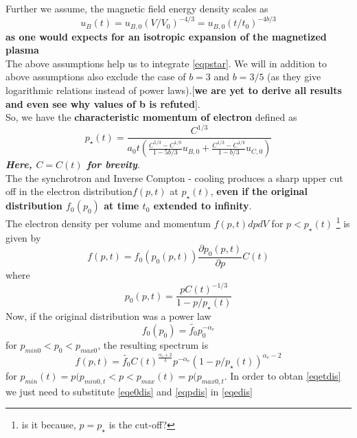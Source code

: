 \documentclass[12pt]{report}
\newcommand{\tbf}[1]{\textbf{#1}}
\newcommand{\tit}[1]{\textit{#1}}
\newcommand{\fn}[1]{\footnote{#1}}
\newcommand{\pe}[2]{\frac{\partial{#1}}{\partial{#2}}}
\newcommand{\cc}[1]{\left({#1}\right)}
\begin{document}
Further we assume, the magnetic field energy density scales as
\begin{equation}
u_B(t)=u_{B,0}(V/V_0)^{-4/3}=u_{B,0}(t/t_0)^{-4b/3}
\end{equation}
\tbf{as one would expects for an isotropic expansion of the magnetized plasma}\\


The above assumptions help us to integrate \eqref{eqpstar}. We will in addition to above assumptions also exclude the case of $b=3$ and $b=3/5$ (as they give logarithmic relations instead of power laws).[\tbf{we are yet to derive all results and even see why values of b is refuted}].\\

So, we have the \tbf{characteristic momentum of electron} defined as 
\begin{equation}
p_\star(t)=\frac{C^{1/3}}{a_0t\cc{\frac{C^{5/3}-C^{1/b}}{1-5b/3} u_{B,0}+\frac{C^{1/3}-C^{1/b}}{1-b/3} u_{C,0}}}
\end{equation}
\tbf{\tit{Here, $C=C(t)$ for brevity}}. \\

The the synchrotron and Inverse Compton - cooling produces a sharp upper cut off in the electron distribution$f(p,t)$ at $p_\star(t)$, \tbf{even if the original distribution $f_0(p_0)$ at time $t_0$ extended to infinity}.\\

The electron density per volume and momentum $f(p,t)dpdV$ for $p<p_\star(t)$ \fn{is it because, $p=p_\star$ is the cut-off?} is given by
\begin{equation}\label{eqedis}
f(p,t)=f_0(p_0(p,t))\pe{p_0(p,t)}{p}C(t)
\end{equation}
where 
\begin{equation}\label{eqpdis}
p_0(p,t)=\frac{pC(t)^{-1/3}}{1-p/p_\star(t)}
\end{equation}
Now, if the original distribution was a power law
\begin{equation}\label{eqe0dis}
f_0(p_0)=\tilde{f_0}p^{-\alpha_e} _0
\end{equation}
for $p_{min0}<p_{0}<p_{max0}$, the resulting spectrum is 
\begin{equation}\label{eqetdis}
f(p,t)=\tilde{f_0}C(t)^{\frac{\alpha_e +2}{3}} p^{-\alpha_e}\cc{1-p/p_\star(t)}^{\alpha_e-2}
\end{equation}
for $p_{min}(t)=p(p_{min0,t}<p<p_{max}(t)=p(p_{max0,t}$. In order to obtan \eqref{eqetdis} we just need to substitute \eqref{eqe0dis} and \eqref{eqpdis} in \eqref{eqedis} \\
\end{document}
